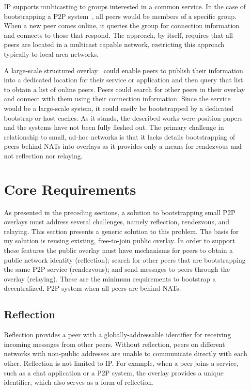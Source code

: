 IP supports multicasting to groups interested in a common service.  In the case
of bootstrapping a P2P system~\cite{pastry, locality_aware}, all peers would be
members of a specific group.  When a new peer comes online, it queries the
group for connection information and connects to those that respond.  The
approach, by itself, requires that all peers are located in a multicast capable
network, restricting this approach typically to local area networks.

A large-scale structured overlay~\cite{one_ring, p2p_bootstrap} could enable
peers to publish their information into a dedicated location for their service
or application and then query that list to obtain a list of online peers.
Peers could search for other peers in their overlay and connect with them using
their connection information.  Since the service would be a large-scale system,
it could easily be bootstrapped by a dedicated bootstrap or host caches.  As it
stands, the described works were position papers and the systems have not been
fully fleshed out.  The primary challenge in relationship to small, ad-hoc
networks is that it lacks details bootstrapping of peers behind NATs into
overlays as it provides only a means for rendezvous and not reflection nor
relaying.

\section{Core Requirements}
\label{bs:overview}

As presented in the preceding sections, a solution to bootstrapping small P2P
overlays must address several challenges, namely reflection, rendezvous, and
relaying.  This section presents a generic solution to this problem.  The basis
for my solution is reusing existing, free-to-join public overlay.  In order to
support these features the public overlay must have mechanisms for peers to
obtain a public network identity (reflection); search for other peers that are
bootstrapping the same P2P service (rendezvous); and send messages to peers
through the overlay (relaying).  These are the minimum requirements to
bootstrap a decentralized, P2P system when all peers are behind NATs.

\subsection{Reflection}
\label{bs:reflection}

Reflection provides a peer with a globally-addressable identifier for receiving
incoming messages from other peers.  Without reflection, peers on different
networks with non-public addresses are unable to communicate directly with each
other.  Reflection is not limited to IP.  For example, when a peer joins a
service, such as a chat application or a P2P system, the overlay provides a
unique identifier, which also serves as a form of reflection.

